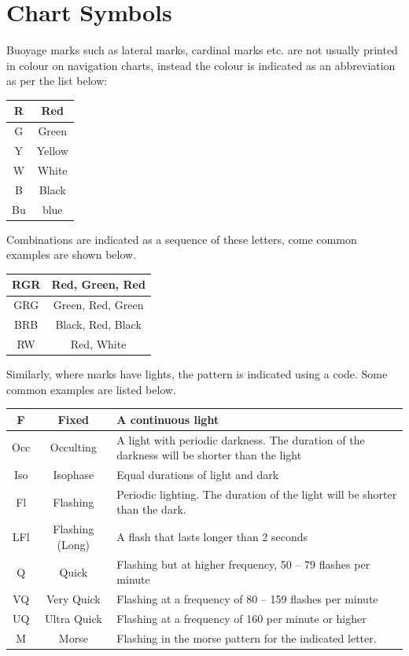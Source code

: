 \documentclass[a4paper,10pt,oneside]{book}
\begin{document}
\newpage
\section{Chart Symbols}

Buoyage marks such as lateral marks, cardinal marks etc. are not usually printed in colour on navigation charts, instead the colour is indicated as an abbreviation as per the list below:

\begin{tabular}{ |c|c| }
	\hline
	R & Red \\
	\hline
	G & Green \\
	\hline
	Y & Yellow \\
	\hline
	W & White \\
	\hline
	B & Black \\
	\hline
	Bu & blue \\
	\hline 
\end{tabular}

Combinations are indicated as a sequence of these letters, come common examples are shown below.

\begin{tabular}{ |c|c| }
	\hline
	RGR & Red, Green, Red\\
	\hline
	GRG & Green, Red, Green \\
	\hline
	BRB & Black, Red, Black \\
	\hline
	RW & Red, White \\
	\hline
\end{tabular}

Similarly, where marks have lights, the pattern is indicated using a code. Some common examples are listed below.

\begin{tabularx}{\textwidth}{ |c|c|X| }
	\hline
	F & Fixed & A continuous light \\
	\hline
	Occ & Occulting & A light with periodic darkness. The duration of the darkness will be shorter than the light \\
	\hline
	Iso & Isophase & Equal durations of light and dark \\
	\hline
	Fl & Flashing & Periodic lighting. The duration of the light will be shorter than the dark. \\
	\hline
	LFl & Flashing (Long) & A flash that lasts longer than 2 seconds \\
	\hline
	Q & Quick & Flashing but at higher frequency, 50 – 79 flashes per minute \\
	\hline
	VQ & Very Quick & Flashing at a frequency of 80 – 159 flashes per minute \\
	\hline
	UQ & Ultra Quick & Flashing at a frequency of 160 per minute or higher \\
	\hline
	M & Morse & Flashing in the morse pattern for the indicated letter. \\
	\hline
\end{tabularx}
\end{document}
